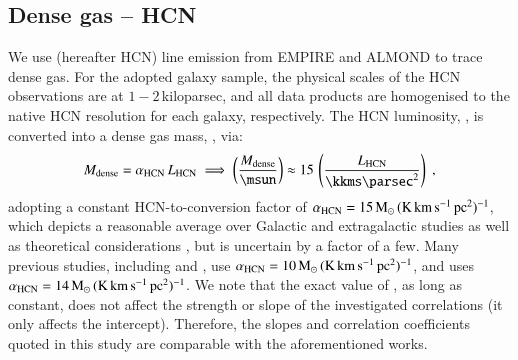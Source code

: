 \documentclass[letter, longauth]{aa} %
\begin{document}
\subsection{Dense gas -- HCN}
\label{sec:data:mdense}
We use \hcnone (hereafter HCN) line emission from EMPIRE \citep{Jimenez-Donaire2019} and ALMOND \citep{Neumann2023a} to trace dense gas.
For the adopted galaxy sample, the physical scales of the HCN observations are at $1-2$\,kiloparsec, and all data products are homogenised to the native HCN resolution for each galaxy, respectively.
The HCN luminosity, \lhcn, is converted into a dense gas mass, \mdense, via:
\begin{align}
    \mdense = \alphahcn \, \lhcn \implies \left(\dfrac{\mdense}{\SI{}{\msun}}\right) \approx \num{15} \, \left(\dfrac{\lhcn}{\SI{}{\kkms\square\parsec}}\right) \;,
\end{align}
adopting a constant HCN-to-\mdense conversion factor of $\alpha_{\text{HCN}} = 15\,\mathrm{M}_\odot\,(\rm K\,km\,s^{-1}\,pc^{2})^{-1}$, which depicts a reasonable average over Galactic \citep{Barnes2020} and extragalactic studies \citep{Gao2004} as well as theoretical considerations \citep{Onus2018}, but is uncertain by a factor of a few.
Many previous studies, including \citet{Gao2004} and \citet{Jimenez-Donaire2019}, use $\alpha_{\text{HCN}} = 10\,\mathrm{M}_\odot\,(\rm K\,km\,s^{-1}\,pc^{2})^{-1}$, and \citet{Neumann2023a} uses $\alpha_{\text{HCN}} = 14\,\mathrm{M}_\odot\,(\rm K\,km\,s^{-1}\,pc^{2})^{-1}$.
We note that the exact value of \alphahcn, as long as constant, does not affect the strength or slope of the investigated correlations (it only affects the intercept).
Therefore, the slopes and correlation coefficients quoted in this study are comparable with the aforementioned works.

\end{document}
